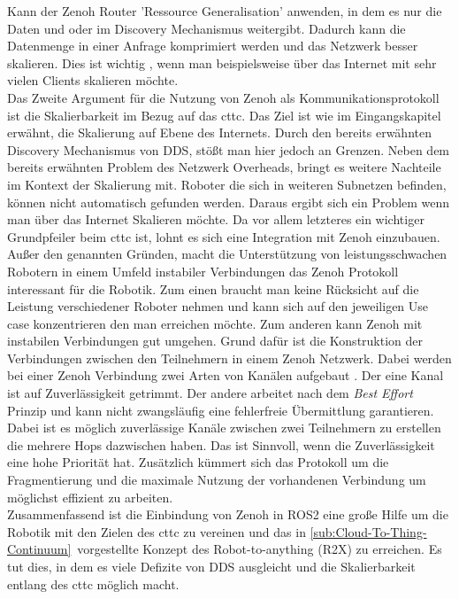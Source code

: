 Kann der Zenoh Router 'Ressource Generalisation' anwenden, in dem es nur die Daten  und  oder  im Discovery Mechanismus weitergibt. Dadurch kann die Datenmenge in einer Anfrage komprimiert werden und das Netzwerk besser skalieren. Dies ist wichtig , wenn man beispielsweise über das Internet mit sehr vielen Clients skalieren möchte.\\
Das Zweite Argument für die Nutzung von Zenoh als Kommunikationsprotokoll ist die Skalierbarkeit im Bezug auf das \acrlong{cttc}. Das Ziel ist wie im Eingangskapitel erwähnt, die Skalierung auf Ebene des Internets. Durch den bereits erwähnten Discovery Mechanismus von DDS, stößt man hier jedoch an Grenzen. Neben dem bereits erwähnten Problem des Netzwerk Overheads, bringt es weitere Nachteile im Kontext der Skalierung mit. Roboter die sich in weiteren Subnetzen befinden, können nicht automatisch gefunden werden. Daraus ergibt sich ein Problem wenn man über das Internet Skalieren möchte. Da vor allem letzteres ein wichtiger Grundpfeiler beim \acrlong{cttc} ist, lohnt es sich eine Integration mit Zenoh einzubauen.\\

Außer den genannten Gründen, macht die Unterstützung von leistungsschwachen Robotern in einem Umfeld instabiler Verbindungen das Zenoh Protokoll interessant für die Robotik. Zum einen braucht man keine Rücksicht auf die Leistung verschiedener Roboter nehmen und kann sich auf den jeweiligen Use case konzentrieren den man erreichen möchte. Zum anderen kann Zenoh mit instabilen Verbindungen gut umgehen. Grund dafür ist die Konstruktion der Verbindungen zwischen den Teilnehmern in einem Zenoh Netzwerk. Dabei werden bei einer Zenoh Verbindung zwei Arten von Kanälen aufgebaut \cite{Eclipsezenoh}. Der eine Kanal ist auf Zuverlässigkeit getrimmt. Der andere arbeitet nach dem \textit{Best Effort} Prinzip und kann nicht zwangsläufig eine fehlerfreie Übermittlung garantieren. Dabei ist es möglich zuverlässige Kanäle zwischen zwei Teilnehmern zu erstellen die mehrere Hops dazwischen haben. Das ist Sinnvoll, wenn die Zuverlässigkeit eine hohe Priorität hat. Zusätzlich kümmert sich das Protokoll um die Fragmentierung und die maximale Nutzung der vorhandenen Verbindung um möglichst effizient zu arbeiten.\\

Zusammenfassend ist die Einbindung von Zenoh in ROS2 eine große Hilfe um die Robotik mit den Zielen des \acrlong{cttc} zu vereinen und das in \ref{sub:Cloud-To-Thing-Continuum} vorgestellte Konzept des Robot-to-anything (R2X) zu erreichen. Es tut dies, in dem es viele Defizite von DDS ausgleicht und die Skalierbarkeit entlang des \acrlong{cttc} möglich macht.\\

